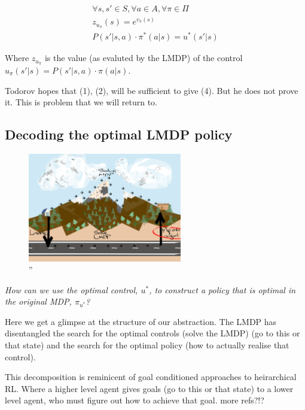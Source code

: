 \begin{align*}
\forall s, s' \in S, \forall a \in A, \forall \pi \in \Pi \\
z_{u_{\pi}}(s) = e^{v_{\pi}(s)} \tag{3} \\
P(s'|s, a) \cdot \pi^{* }(a|s) = u^{* }(s'|s) \tag{4}
\end{align*}

Where $z_{u_{\pi}}$ is the value (as evaluted by the LMDP) of the control $u_{\pi}(s'|s) = P(s'|s, a) \cdot \pi(a|s)$.

Todorov hopes that (1), (2), will be sufficient to give (4). But he does not prove it.
This is problem that we will return to.


\subsection{Decoding the optimal LMDP policy}

\begin{figure}[h!]
\centering
\includegraphics[width=0.6\textwidth,height=0.3\textheight]{../../pictures/drawings/abstract-representations-project.png}
\caption{''}
\end{figure}

\begin{displayquote}
\textit{How can we use the optimal control, $u^{* }$, to construct a policy that is optimal in the original MDP, $\pi_{u^* }$?}
\end{displayquote}

Here we get a glimpse at the structure of our abstraction.
The LMDP has disentangled the search for the optimal controls (solve the LMDP) (go to this or
that state) and the search for the optimal policy (how to actually
realise that control).

This decomposition is reminicent of goal conditioned approaches to heirarchical RL.
Where a higher level agent gives goals (go to this or that state) to a lower level
agent, who must figure out how to achieve that goal. \cite{Vezhnevets2017} {\color{red}more refs?!?}

